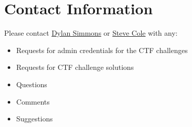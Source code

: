 \documentclass[11pt]{article}
\begin{document}
\section{Contact Information}

Please contact \href{mailto:dylan.simmons@wustl.edu}{Dylan Simmons} or \href{mailto:svcole@wustl.edu}{Steve Cole} with any:

\begin{itemize}
   \item Requests for admin credentials for the CTF challenges
   \item Requests for CTF challenge solutions
   \item Questions
   \item Comments
   \item Suggestions
\end{itemize}
\end{document}

